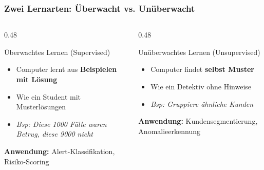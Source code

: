\documentclass[11pt, aspectratio=169]{beamer}
\begin{document}
\begin{frame}
    \frametitle{Zwei Lernarten: Überwacht vs. Unüberwacht}
    \begin{columns}[t]
        \begin{column}{0.48\textwidth}
            \begin{block}{Überwachtes Lernen (Supervised)}
                \begin{itemize}
                    \item Computer lernt aus \textbf{Beispielen mit Lösung}
                    \item Wie ein Student mit Musterlösungen
                    \item \textit{Bsp: \glqq Diese 1000 Fälle waren Betrug, diese 9000 nicht\grqq}
                \end{itemize}
                \vspace{0.2cm}
                \textbf{Anwendung:} Alert-Klassifikation, Risiko-Scoring
            \end{block}
        \end{column}
        \begin{column}{0.48\textwidth}
            \begin{block}{Unüberwachtes Lernen (Unsupervised)}
                \begin{itemize}
                    \item Computer findet \textbf{selbst Muster}
                    \item Wie ein Detektiv ohne Hinweise
                    \item \textit{Bsp: \glqq Gruppiere ähnliche Kunden\grqq}
                \end{itemize}
                \vspace{0.2cm}
                \textbf{Anwendung:} Kundensegmentierung, Anomalieerkennung
            \end{block}
        \end{column}
    \end{columns}
\end{frame}

\end{document}
